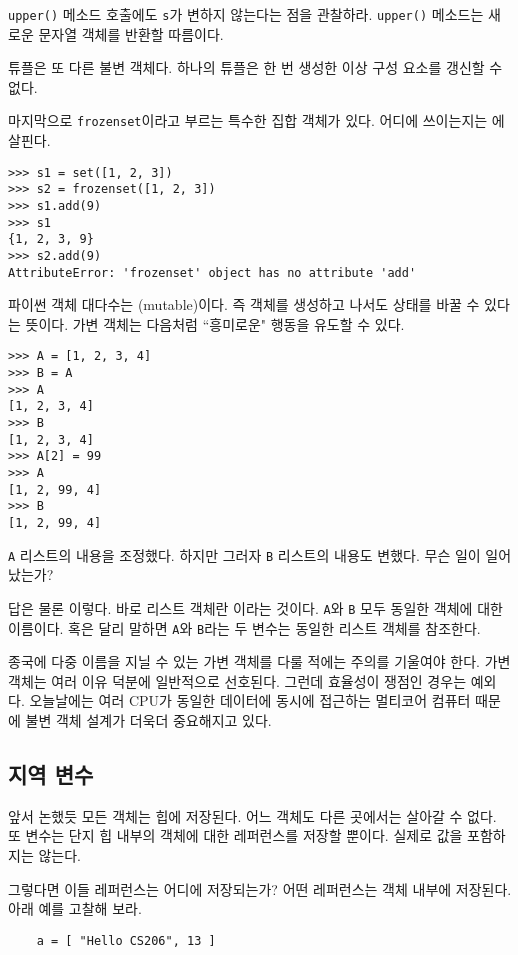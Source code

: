 \documentclass[a4paper]{oblivoir}
\begin{document}
\noindent\texttt{upper()} 메소드 호출에도 \texttt{s}가 변하지 않는다는 점을 관찰하라. \texttt{upper()} 메소드는 새로운 문자열 객체를 반환할 따름이다.

튜플은 또 다른 불변 객체다. 하나의 튜플은 한 번 생성한 이상 구성 요소를 갱신할 수 없다.

마지막으로 \texttt{frozenset}이라고 부르는 특수한 집합 객체가 있다. 어디에 쓰이는지는 에 살핀다.

\begin{lstlisting}
>>> s1 = set([1, 2, 3])
>>> s2 = frozenset([1, 2, 3])
>>> s1.add(9)
>>> s1
{1, 2, 3, 9}
>>> s2.add(9)
AttributeError: 'frozenset' object has no attribute 'add'
\end{lstlisting}

파이썬 객체 대다수는 (mutable)이다. 즉 객체를 생성하고 나서도 상태를 바꿀 수 있다는 뜻이다. 가변 객체는 다음처럼 ``흥미로운" 행동을 유도할 수 있다.

\begin{lstlisting}
>>> A = [1, 2, 3, 4]
>>> B = A
>>> A
[1, 2, 3, 4]
>>> B
[1, 2, 3, 4]
>>> A[2] = 99
>>> A
[1, 2, 99, 4]
>>> B
[1, 2, 99, 4]
\end{lstlisting}

 \texttt{A} 리스트의 내용을 조정했다. 하지만 그러자 \texttt{B} 리스트의 내용도 변했다. 무슨 일이 일어났는가?

답은 물론 이렇다. 바로 리스트 객체란 이라는 것이다. \texttt{A}와 \texttt{B} 모두 동일한 객체에 대한 이름이다. 혹은 달리 말하면 \texttt{A}와 \texttt{B}라는 두 변수는 동일한 리스트 객체를 참조한다. 

종국에 다중 이름을 지닐 수 있는 가변 객체를 다룰 적에는 주의를 기울여야 한다. 가변 객체는 여러 이유 덕분에 일반적으로 선호된다. 그런데 효율성이 쟁점인 경우는 예외다. 오늘날에는 여러 CPU가 동일한 데이터에 동시에 접근하는 멀티코어 컴퓨터 때문에 불변 객체 설계가 더욱더 중요해지고 있다.

\subsection*{지역 변수}

앞서 논했듯 모든 객체는 힙에 저장된다. 어느 객체도 다른 곳에서는 살아갈 수 없다. 또 변수는 단지 힙 내부의 객체에 대한 레퍼런스를 저장할 뿐이다. 실제로 값을 포함하지는 않는다.

그렇다면 이들 레퍼런스는 어디에 저장되는가? 어떤 레퍼런스는 객체 내부에 저장된다. 아래 예를 고찰해 보라.

\begin{verbatim}
    a = [ "Hello CS206", 13 ]
\end{verbatim}
\end{document}
